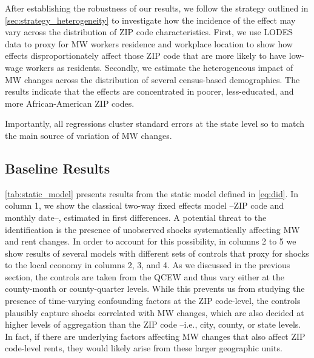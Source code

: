 
After establishing the robustness of our results, we follow the strategy outlined in 
\autoref{sec:strategy_heterogeneity} to investigate how the incidence of the effect may vary 
across the distribution of ZIP code characteristics. First, we use LODES data to proxy for MW 
workers residence and workplace location to show how effects disproportionately affect those 
ZIP code that are more likely to have low-wage workers as residents. Secondly, we estimate the 
heterogeneous impact of MW changes across the distribution of several census-based 
demographics. The results indicate that the effects are concentrated in poorer, less-educated, 
and more African-American ZIP codes. 

Importantly, all regressions cluster standard errors at the state level so to match the main 
source of variation of MW changes.

\subsection{Baseline Results}\label{sec:baseline_results}

\autoref{tab:static_model} presents results from the static model defined in \autoref{eq:did}. 
In column 1, we show the classical two-way fixed effects model --ZIP code and monthly date--, 
estimated in first differences. A potential threat to the identification is the presence of 
unobserved shocks systematically affecting MW and rent changes. In order to account for this 
possibility, in columns 2 to 5 we show results of several models with different sets of 
controls that proxy for shocks to the local economy in columns 2, 3, and 4. As we discussed in 
the previous section, the controls are taken from the QCEW and thus vary either at the 
county-month or county-quarter levels. While this prevents us from studying the presence of 
time-varying confounding factors at the ZIP code-level, the controls plausibly capture shocks 
correlated with MW changes, which are also decided at higher levels of aggregation than the 
ZIP code --i.e., city, county, or state levels. In fact, if there are underlying factors 
affecting MW changes that also affect ZIP code-level rents, they would likely arise from these 
larger geographic units. 

